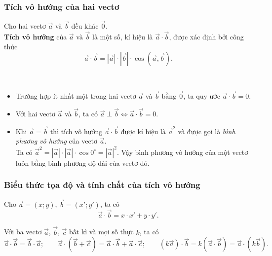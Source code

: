 \subsubsection{Tích vô hướng của hai vectơ}
\begin{khung4}{}
	Cho hai vectơ $\vec{a}$ và $\vec{b}$ đều khác $\vec{0}$.\\
	\textbf{Tích vô hướng} của $\vec{a}$ và $\vec{b}$ là một số, kí hiệu là $\vec{a}\cdot \vec{b}$, được xác định bởi công thức
	$$\vec{a}\cdot \vec{b}=\left|\vec{a}\right|\cdot \left |\vec{b}\right|\cdot \cos \left(\vec{a},\vec{b}\right).$$
\end{khung4}
\begin{khung4}{}\,
	\begin{itemize}
		\item Trường hợp ít nhất một trong hai vectơ $\vec{a}$ và $\vec{b}$ bằng $\vec{0}$, ta quy ước $\vec{a}\cdot \vec{b}=0$.
		\item Với hai vectơ $\vec{a}$ và $\vec{b}$, ta có $\vec{a}\perp \vec{b}\Leftrightarrow \vec{a}\cdot \vec{b}=0$.
		\item Khi $\vec{a}=\vec{b}$ thì tích vô hướng $\vec{a}\cdot \vec{b}$ được kí hiệu là $\vec{a}^2$ và được gọi là \textit{bình phương vô hướng} của vectơ $\vec{a}$.\\
		Ta có $\vec{a}^2=\left|\vec{a}\right|\cdot \left|\vec{a}\right|\cdot \cos 0^\circ=\left|\vec{a}\right|^2$. Vậy bình phương vô hướng của một vectơ luôn bằng bình phương độ dài của vectơ đó.
	\end{itemize}
\end{khung4}
\subsubsection{Biểu thức tọa độ và tính chất của tích vô hướng}
\begin{tc}
	Cho $\vec{a}=(x;y)$, $\vec{b}=(x';y')$, ta có
	$$\vec{a}\cdot \vec{b}=x\cdot x'+y\cdot y'.$$
\end{tc}
\begin{tc}
	Với ba vectơ $\vec{a}$, $\vec{b}$, $\vec{c}$ bất kì và mọi số thực $k$, ta có
	$$\vec{a}\cdot \vec{b}=\vec{b}\cdot \vec{a};\qquad \vec{a}\cdot \left(\vec{b}+\vec{c}\right)=\vec{a}\cdot \vec{b}+\vec{a}\cdot \vec{c};\qquad \left(k\vec{a}\right)\cdot \vec{b}=k\left(\vec{a}\cdot \vec{b}\right)=\vec{a}\cdot \left(k\vec{b}\right).$$
\end{tc}
